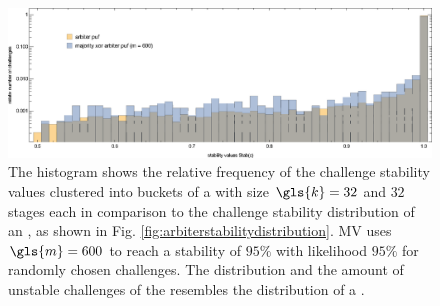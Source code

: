 \begin{figure}[ht]
\includegraphics[width=1.00\textwidth]{images/comparison-arbiter-stability-distribution-majority-xor-stability-distribution.eps}
\caption[Challenge stability distribution comparison of a \mxpuf]{The histogram shows the relative frequency of the challenge stability values clustered into buckets of a \mxpuf with size $\gls{k} = 32$ and $32$ stages each in comparison to the challenge stability distribution of an \apuf, as shown in Fig. \ref{fig:arbiterstabilitydistribution}. \ac{MV} uses $\gls{m} = 600$ to reach a stability of $95 \%$ with likelihood $95 \%$ for randomly chosen challenges. The distribution and the amount of unstable challenges of the \mxpuf resembles the distribution of a \apuf.} 
\label{fig:comparisonarbiterstabilitydistributionmajorityxorstabilitydistribution}
\end{figure}












